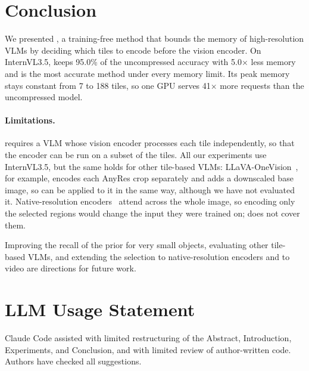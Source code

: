 \section{Conclusion}
\label{sec:conclusion}

We presented \method, a training-free method that bounds the memory of high-resolution VLMs by
deciding which tiles to encode before the vision encoder. On InternVL3.5, \method keeps 95.0\% of the uncompressed accuracy with
5.0$\times$ less memory and is the most accurate method under every memory limit. Its peak memory stays
constant from 7 to 188 tiles, so one GPU serves 41$\times$ more requests than the uncompressed model.

\paragraph{Limitations.}
\method requires a VLM whose vision encoder processes each tile independently, so that the encoder can be
run on a subset of the tiles. All our experiments use InternVL3.5, but the same holds for other tile-based
VLMs: LLaVA-OneVision~\cite{llavaov}, for example, encodes each AnyRes crop separately and adds a
downscaled base image, so \method can be applied to it in the same way, although we have not evaluated it.
Native-resolution encoders~\cite{qwen2vl} attend across the whole image, so encoding only the selected
regions would change the input they were trained on; \method does not cover them.

Improving the recall of the prior for very small objects, evaluating other tile-based VLMs, and
extending the selection to native-resolution encoders and to video are directions for future work.

\section*{LLM Usage Statement}
Claude Code assisted with limited restructuring of the Abstract, Introduction, Experiments, and Conclusion,
and with limited review of author-written code. Authors have checked all suggestions.
